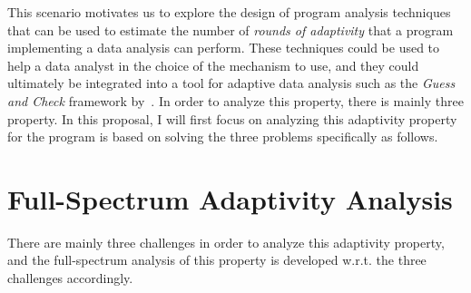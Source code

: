 This scenario motivates us to explore the design of program analysis techniques that can be used to estimate the number of \emph{rounds of adaptivity} that a program implementing a data analysis can perform. These techniques could be used to help a data analyst in the choice of the mechanism to use,
and they
could ultimately be integrated into a tool for adaptive data analysis such as the \emph{Guess and Check} framework by~\cite{RogersRSSTW20}. 
%
In order to analyze this property, there is mainly three property. 
In this proposal, I will first focus on analyzing 
this adaptivity property for the program is based on solving the three problems specifically as follows.

\section{Full-Spectrum Adaptivity Analysis}
\label{sec:intro-adapt}
There are mainly three challenges in order to analyze this adaptivity property, 
and the full-spectrum analysis of this property is 
developed w.r.t. the three challenges accordingly.

